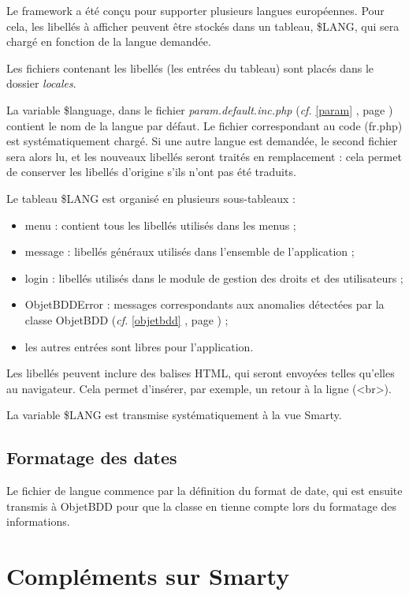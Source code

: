 Le framework a été conçu pour supporter plusieurs langues européennes. Pour cela, les libellés à afficher peuvent être stockés dans un tableau, \$LANG, qui sera chargé en fonction de la langue demandée.

Les fichiers contenant les libellés (les entrées du tableau) sont placés dans le dossier \textit{locales}.

La variable \$language, dans le fichier \textit{param.default.inc.php} (\textit{cf.} \ref{param} \textit{}, page \pageref{param}) contient le nom de la langue par défaut. Le fichier correspondant au code (fr.php) est systématiquement chargé. Si une autre langue est demandée, le second fichier sera alors lu, et les nouveaux libellés seront traités en remplacement : cela permet de conserver les libellés d'origine s'ils n'ont pas été traduits.

Le tableau \$LANG est organisé en plusieurs sous-tableaux :
\begin{itemize}
\item menu : contient tous les libellés utilisés dans les menus ;
\item message : libellés généraux utilisés dans l'ensemble de l'application ;
\item login : libellés utilisés dans le module de gestion des droits et des utilisateurs ;
\item ObjetBDDError : messages correspondants aux anomalies détectées par la classe ObjetBDD (\textit{cf.} \ref{objetbdd} \textit{}, page \pageref{objetbdd}) ;
\item les autres entrées sont libres pour l'application.
\end{itemize}

Les libellés peuvent inclure des balises HTML, qui seront envoyées telles qu'elles au navigateur. Cela permet d'insérer, par exemple, un retour à la ligne (<br>).

La variable \$LANG est transmise systématiquement à la vue Smarty.

\section{Formatage des dates}
Le fichier de langue commence par la définition du format de date, qui est ensuite transmis à ObjetBDD pour que la classe en tienne compte lors du formatage des informations. 

\chapter{Compléments sur Smarty}\label{smarty}

